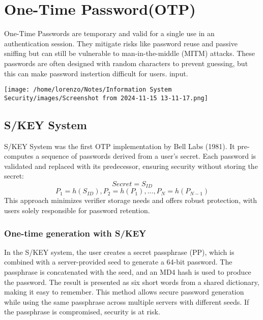 \section{One-Time Password(OTP)}
\begin{minipage}{0.6\textwidth}
\vspace{-1.0cm}
One-Time Passwords are temporary and valid for a single use in an authentication session. They mitigate risks like password reuse and passive sniffing but can still be vulnerable to man-in-the-middle (MITM) attacks. 
These passwords are often designed 
with random characters to prevent 
guessing, but this can make password instertion difficult for users. 
input.
\end{minipage} 
\hspace{0.5cm}
\begin{minipage}{0.4\textwidth}
    
    \texttt{[image: /home/lorenzo/Notes/Information System Security/images/Screenshot from 2024-11-15 13-11-17.png]}
\end{minipage}

\subsection{S/KEY System}
S/KEY System was the first OTP implementation by Bell Labs (1981).
It pre-computes a sequence of passwords derived from a user’s secret. 
Each password is validated and replaced with its predecessor, ensuring security 
without storing the secret:
\[Secret = S_{ID}\]
\[P_1=h(S_{ID}),P_2=h(P_1),...,P_N=h(P_{N-1})\]
\noindent
This approach 
minimizes verifier storage needs and offers robust protection, with users solely 
responsible for password retention.
\subsubsection{One-time generation with S/KEY}

In the S/KEY system, the user creates 
a secret passphrase (PP), which is combined 
with a server-provided seed to generate a 64-bit 
password. The passphrase is concatenated with the seed, 
and an MD4 hash is used to produce the password. 
The result is presented as six short words from a shared 
dictionary, making it easy to remember. This method allows secure password generation while using the same passphrase across multiple servers with different seeds. If the passphrase is compromised, security is at risk.
